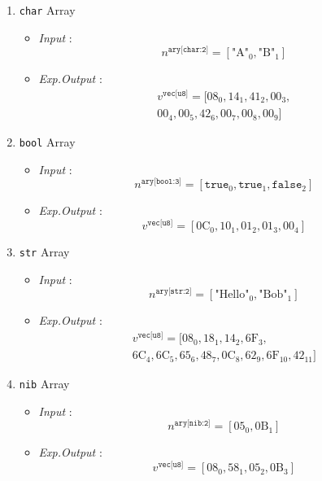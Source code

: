 \documentclass[../alan-handbook.tex]{subfiles}
\begin{document}
\begin{enumerate}
\begin{enumerate}
            \item \texttt{char} Array
                \begin{itemize}
                    \item \textit{Input} : $$n^{\texttt{ary[char:2]}} = [\text{"A"}_0, \text{"B"}_1]$$
                    \item \textit{Exp.Output} : $$\begin{matrix}v^{\texttt{vec[u8]}} = [\text{08}_0,\text{14}_1,\text{41}_2,\text{00}_3, \\ \text{00}_4,\text{00}_5,\text{42}_6,\text{00}_7,\text{00}_8,\text{00}_9]\end{matrix}$$
                \end{itemize}
            \item \texttt{bool} Array
                \begin{itemize}
                    \item \textit{Input} : $$n^{\texttt{ary[bool:3]}} = [\texttt{true}_0,\texttt{true}_1,\texttt{false}_2]$$
                    \item \textit{Exp.Output} : $$v^{\texttt{vec[u8]}} = [\text{0C}_0,\text{10}_1,\text{01}_2,\text{01}_3,\text{00}_4]$$
                \end{itemize}
            \item \texttt{str} Array
                \begin{itemize}
                    \item \textit{Input} : $$n^{\texttt{ary[str:2]}} = [\text{"Hello"}_0,\text{"Bob"}_1]$$
                    \item \textit{Exp.Output} : $$\begin{matrix}v^{\texttt{vec[u8]}} = [\text{08}_0,\text{18}_1,\text{14}_2,\text{6F}_3, \\ \text{6C}_4,\text{6C}_5,\text{65}_6,\text{48}_7,\text{0C}_8,\text{62}_9,\text{6F}_{10},\text{42}_{11}]\end{matrix}$$
                \end{itemize}
            \item \texttt{nib} Array
                \begin{itemize}
                    \item \textit{Input} : $$n^{\texttt{ary[nib:2]}} = [\text{05}_0,\text{0B}_1]$$
                    \item \textit{Exp.Output} : $$v^{\texttt{vec[u8]}} = [\text{08}_0,\text{58}_1,\text{05}_2,\text{0B}_3]$$
                \end{itemize}

\end{enumerate}
\end{enumerate}
\end{document}
